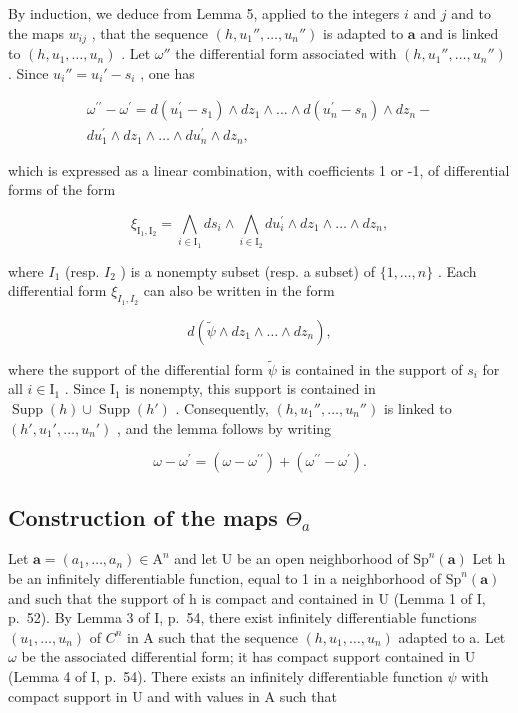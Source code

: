 By induction, we deduce from Lemma 5, applied to the integers \(i\) and \(j\) and to the maps \(w_{ij}\) , that the sequence \((h,u_1'',\ldots,u_n'')\) is adapted to \(\boldsymbol{a}\) and is linked to \((h,u_1,\ldots,u_n)\) . Let \(\omega''\) the differential form associated with \((h,u_1'',\ldots,u_n'')\) . Since \(u_i'' = u_i' - s_i\) , one has

\[
\begin{array}{r} \omega^ {\prime \prime} - \omega^ {\prime} = d (u _ {1} ^ {\prime} - s _ {1}) \wedge d z _ {1} \wedge \dots \wedge d (u _ {n} ^ {\prime} - s _ {n}) \wedge d z _ {n} - \\ d u _ {1} ^ {\prime} \wedge d z _ {1} \wedge \dots \wedge d u _ {n} ^ {\prime} \wedge d z _ {n}, \end{array}
\]

which is expressed as a linear combination, with coefficients 1 or -1, of differential forms of the form

\[
\xi_ {\mathrm{I} _ {1}, \mathrm{I} _ {2}} = \bigwedge_ {i \in \mathrm{I} _ {1}} d s _ {i} \wedge \bigwedge_ {i \in \mathrm{I} _ {2}} d u _ {i} ^ {\prime} \wedge d z _ {1} \wedge \dots \wedge d z _ {n},
\]

where \(I_{1}\) (resp. \(I_{2}\) ) is a nonempty subset (resp. a subset) of \(\{1,\ldots,n\}\) . Each differential form \(\xi_{I_{1},I_{2}}\) can also be written in the form

\[
d (\widetilde {\psi} \wedge d z _ {1} \wedge \dots \wedge d z _ {n}),
\]

where the support of the differential form \(\widetilde{\psi}\) is contained in the support of \(s_i\) for all \(i \in \mathrm{I}_1\) . Since \(\mathrm{I}_1\) is nonempty, this support is contained in \(\operatorname{Supp}(h) \cup \operatorname{Supp}(h')\) . Consequently, \((h, u_1'', \ldots, u_n'')\) is linked to \((h', u_1', \ldots, u_n')\) , and the lemma follows by writing

\[
\omega - \omega^ {\prime} = (\omega - \omega^ {\prime \prime}) + (\omega^ {\prime \prime} - \omega^ {\prime}).
\]

\subsection{\texorpdfstring{Construction of the maps \(\Theta_{a}\)}{Construction of the maps \textbackslash Theta\_\{a\}}}

Let \(\boldsymbol{a}=(a_{1},\ldots,a_{n})\in\mathrm{A}^{n}\) and let U be an open neighborhood of \(\mathrm{Sp}^{n}(\boldsymbol{a})\) Let h be an infinitely differentiable function, equal to 1 in a neighborhood of \(\mathrm{Sp}^{n}(\boldsymbol{a})\) and such that the support of h is compact and contained in U (Lemma 1 of I, p.~52). By Lemma 3 of I, p.~54, there exist infinitely differentiable functions \((u_{1},\ldots,u_{n})\) of \(C^{n}\) in A such that the sequence \((h,u_{1},\ldots,u_{n})\) adapted to a. Let \(\omega\) be the associated differential form; it has compact support contained in U (Lemma 4 of I, p.~54). There exists an infinitely differentiable function \(\psi\) with compact support in U and with values in A such that

